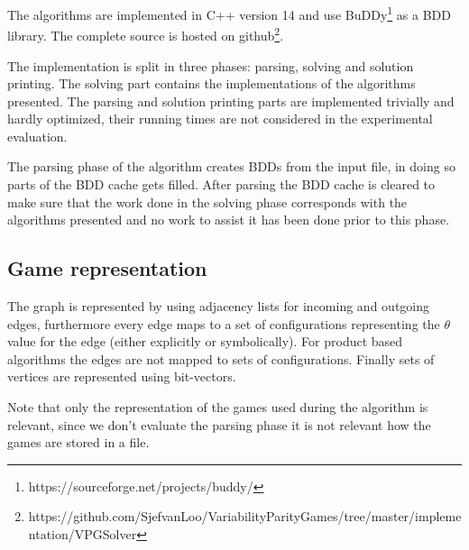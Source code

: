 The algorithms are implemented in C++ version 14 and use BuDDy\footnote{\label{note1}https://sourceforge.net/projects/buddy/} as a BDD library. The complete source is hosted on github\footnote{\label{note2}https://github.com/SjefvanLoo/VariabilityParityGames/tree/master/implementation/VPGSolver}.

The implementation is split in three phases: parsing, solving and solution printing. The solving part contains the implementations of the algorithms presented. The parsing and solution printing parts are implemented trivially and hardly optimized, their running times are not considered in the experimental evaluation.

The parsing phase of the algorithm creates BDDs from the input file, in doing so parts of the BDD cache gets filled. After parsing the BDD cache is cleared to make sure that the work done in the solving phase corresponds with the algorithms presented and no work to assist it has been done prior to this phase.

\subsection{Game representation}
The graph is represented by using adjacency lists for incoming and outgoing edges, furthermore every edge maps to a set of configurations representing the $\theta$ value for the edge (either explicitly or symbolically). For product based algorithms the edges are not mapped to sets of configurations. Finally sets of vertices are represented using bit-vectors.

Note that only the representation of the games used during the algorithm is relevant, since we don't evaluate the parsing phase it is not relevant how the games are stored in a file.
